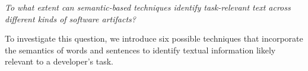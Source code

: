 



\medskip
\begin{bluequote}
    \textit{To what extent can semantic-based techniques identify task-relevant text across different kinds of software artifacts?}
\end{bluequote}




To investigate this question, we introduce six possible techniques that incorporate the  
semantics of words and sentences to identify textual information likely relevant to a developer's task.












